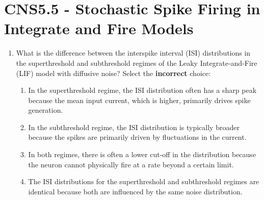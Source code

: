 \documentclass[11pt,letterpaper]{article}
\begin{document}
\section{CNS5.5 - Stochastic Spike Firing in Integrate and Fire Models}
\begin{enumerate}
    \item What is the difference between the interspike interval (ISI) distributions in the superthreshold and subthreshold regimes of the Leaky Integrate-and-Fire (LIF) model with diffusive noise? Select the \textbf{incorrect} choice:
    \begin{enumerate}
        \item In the superthreshold regime, the ISI distribution often has a sharp peak because the mean input current, which is higher, primarily drives spike generation.
        \item In the subthreshold regime, the ISI distribution is typically broader because the spikes are primarily driven by fluctuations in the current.
        \item In both regimes, there is often a lower cut-off in the distribution because the neuron cannot physically fire at a rate beyond a certain limit.
        \item The ISI distributions for the superthreshold and subthreshold regimes are identical because both are influenced by the same noise distribution.
    \end{enumerate}

\end{enumerate}
\pagebreak
\end{document}
